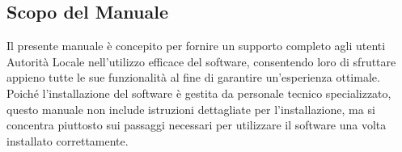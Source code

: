 \subsection{Scopo del Manuale}
Il presente manuale è concepito per fornire un supporto completo agli utenti Autorità Locale nell'utilizzo efficace del software, consentendo loro di sfruttare appieno tutte le sue funzionalità al fine di garantire un'esperienza ottimale. \\
Poiché l'installazione del software è gestita da personale tecnico specializzato, questo manuale non include istruzioni dettagliate per l'installazione, ma si concentra piuttosto sui passaggi necessari per utilizzare il software una volta installato correttamente.